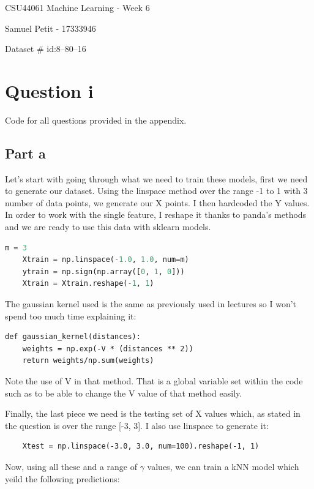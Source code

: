 \documentclass[10pt]{article}
\begin{document}
{\centering
    CSU44061 Machine Learning - Week 6
    \par
    Samuel Petit - 17333946
    \par
    Dataset \# id:8--80--16 
    \par
}
\section*{Question i}
Code for all questions provided in the appendix.

\subsection*{Part a}
Let's start with going through what we need to train these models, first we need to generate our dataset.
Using the linspace method over the range -1 to 1 with 3 number of data points,
we generate our X points. I then hardcoded the Y values. In order to work
with the single feature, I reshape it thanks to panda's methods and we
are ready to use this data with sklearn models.

\begin{lstlisting}[language=Python]  
    m = 3
    Xtrain = np.linspace(-1.0, 1.0, num=m)
    ytrain = np.sign(np.array([0, 1, 0]))
    Xtrain = Xtrain.reshape(-1, 1)  
\end{lstlisting}

The gaussian kernel used is the same as previously used in lectures so I
won't spend too much time explaining it:

\begin{lstlisting}
def gaussian_kernel(distances):
    weights = np.exp(-V * (distances ** 2))
    return weights/np.sum(weights)
\end{lstlisting}

Note the use of V in that method. That is a global variable set within the
code such as to be able to change the V value of that method easily.

Finally, the last piece we need is the testing set of X values which, as stated
in the question is over the range [-3, 3]. I also use linspace to generate it:

\begin{lstlisting}
    Xtest = np.linspace(-3.0, 3.0, num=100).reshape(-1, 1)
\end{lstlisting}


Now, using all these and a range of $\gamma$ values, we can train a kNN model
which yeild the following predictions:
\end{document}

